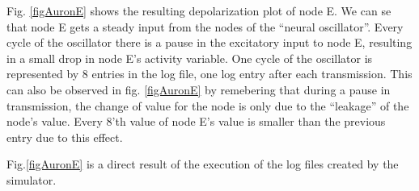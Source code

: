 	Fig. \ref{figAuronE} shows the resulting depolarization plot of node E. 
	We can se that node E gets a steady input from the nodes of the ``neural oscillator''.
	Every cycle of the oscillator there is a pause in the excitatory input to node E, resulting in a small drop in node E's activity variable. 
	One cycle of the oscillator is represented by 8 entries in the log file, one log entry after each transmission.
	This can also be observed in fig. \ref{figAuronE} by remebering that during a pause in transmission, the change of value for the node is only due to the ``leakage'' of the node's value.
	Every 8'th value of node E's value is smaller than the previous entry due to this effect.


	Fig.\ref{figAuronE} is a direct result of the execution of the log files created by the simulator.

